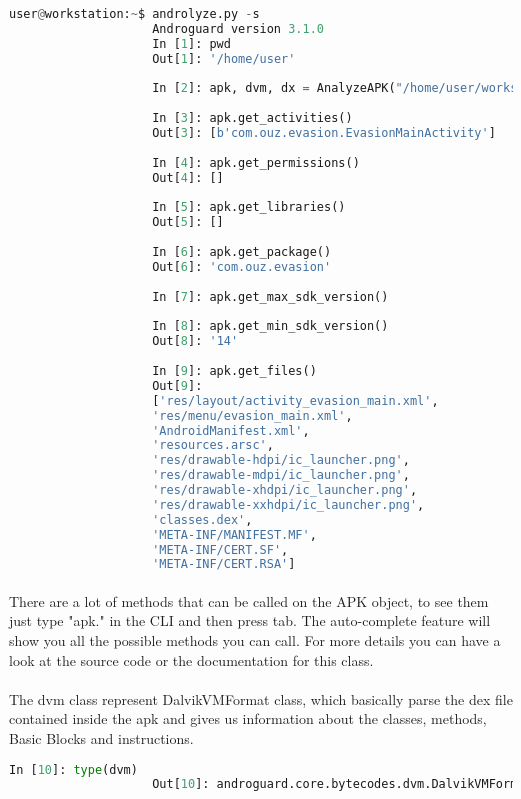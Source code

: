 \documentclass[../main.tex]{subfile}
\begin{document}
		
				\begin{lstlisting}[language=python]
					user@workstation:~$ androlyze.py -s
					Androguard version 3.1.0
					In [1]: pwd
					Out[1]: '/home/user'
					
					In [2]: apk, dvm, dx = AnalyzeAPK("/home/user/workspace/apps/evasion.apk")
					
					In [3]: apk.get_activities()
					Out[3]: [b'com.ouz.evasion.EvasionMainActivity']
					
					In [4]: apk.get_permissions()
					Out[4]: []
					
					In [5]: apk.get_libraries()
					Out[5]: []
					
					In [6]: apk.get_package()
					Out[6]: 'com.ouz.evasion'
					
					In [7]: apk.get_max_sdk_version()
					
					In [8]: apk.get_min_sdk_version()
					Out[8]: '14'
					
					In [9]: apk.get_files()
					Out[9]: 
					['res/layout/activity_evasion_main.xml',
					'res/menu/evasion_main.xml',
					'AndroidManifest.xml',
					'resources.arsc',
					'res/drawable-hdpi/ic_launcher.png',
					'res/drawable-mdpi/ic_launcher.png',
					'res/drawable-xhdpi/ic_launcher.png',
					'res/drawable-xxhdpi/ic_launcher.png',
					'classes.dex',
					'META-INF/MANIFEST.MF',
					'META-INF/CERT.SF',
					'META-INF/CERT.RSA']
				\end{lstlisting}
			\paragraph{} There are a lot of methods that can be called on the APK object, to see them just type "apk." in the CLI and then press tab. The auto-complete feature will show you all the possible methods you can call. For more details you can have a look at the source code or the documentation for this class.
			
			\paragraph{} The dvm class represent DalvikVMFormat class, which basically parse the dex file contained inside the apk and gives us information about the classes, methods, Basic Blocks and instructions.
				\begin{lstlisting}[language=python, firstnumber=39]
					In [10]: type(dvm)
					Out[10]: androguard.core.bytecodes.dvm.DalvikVMFormat
				\end{lstlisting}
\end{document}
